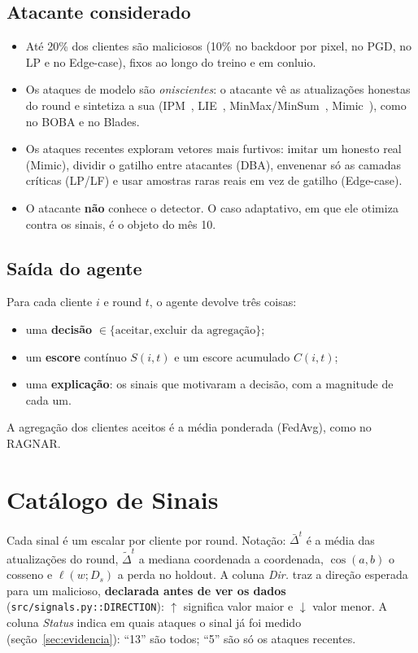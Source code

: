 \documentclass[11pt,a4paper]{article}
\begin{document}
\subsection{Atacante considerado}
\begin{itemize}
  \item Até 20\% dos clientes são maliciosos (10\% no backdoor por pixel, no PGD, no LP e no Edge-case), fixos ao longo do treino e em conluio.
  \item Os ataques de modelo são \emph{oniscientes}: o atacante vê as atualizações honestas do round e
        sintetiza a sua (IPM~\cite{ipm}, LIE~\cite{lie}, MinMax/MinSum~\cite{minmax}, Mimic~\cite{mimic}),
        como no BOBA e no Blades.
  \item Os ataques recentes exploram vetores mais furtivos: imitar um honesto real (Mimic), dividir o
        gatilho entre atacantes (DBA), envenenar só as camadas críticas (LP/LF) e usar amostras raras reais
        em vez de gatilho (Edge-case).
  \item O atacante \textbf{não} conhece o detector. O caso adaptativo, em que ele otimiza contra os sinais,
        é o objeto do mês 10.
\end{itemize}

\subsection{Saída do agente}
Para cada cliente $i$ e round $t$, o agente devolve três coisas:
\begin{itemize}
  \item uma \textbf{decisão} $\in \{\text{aceitar}, \text{excluir da agregação}\}$;
  \item um \textbf{escore} contínuo $S(i,t)$ e um escore acumulado $C(i,t)$;
  \item uma \textbf{explicação}: os sinais que motivaram a decisão, com a magnitude de cada um.
\end{itemize}
A agregação dos clientes aceitos é a média ponderada (FedAvg), como no RAGNAR.

\section{Catálogo de Sinais}
\label{sec:catalogo}

Cada sinal é um escalar por cliente por round. Notação: $\bar\Delta^t$ é a média das atualizações do round,
$\tilde\Delta^t$ a mediana coordenada a coordenada, $\cos(a,b)$ o cosseno e $\ell(w; D_s)$ a perda no holdout.
A coluna \emph{Dir.} traz a direção esperada para um malicioso, \textbf{declarada antes de ver os dados}
(\texttt{src/signals.py::DIRECTION}): $\uparrow$ significa valor maior e $\downarrow$ valor menor.
A coluna \emph{Status} indica em quais ataques o sinal já foi medido (seção~\ref{sec:evidencia}): ``13''
são todos; ``5'' são só os ataques recentes.
\end{document}

